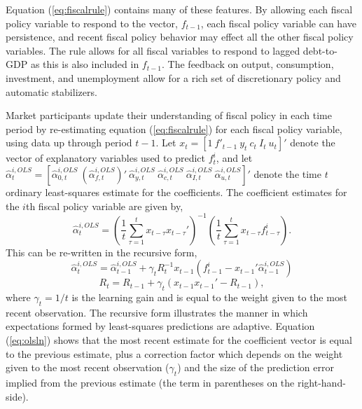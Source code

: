 \documentclass[11pt]{article}
\newcommand{\beq}{\begin{equation}}
\newcommand{\eeq}{\end{equation}}
\begin{document}
Equation (\ref{eq:fiscalrule}) contains many of these features.  By allowing each fiscal policy variable to respond to the vector, $f_{t-1}$, each fiscal policy variable can have persistence, and recent fiscal policy behavior may effect all the other fiscal policy variables.  The rule allows for all fiscal variables to respond to lagged debt-to-GDP as this is also included in $f_{t-1}$.  The feedback on output, consumption, investment, and unemployment allow for a rich set of discretionary policy and automatic stabilizers.

Market participants update their understanding of fiscal policy in each time period by re-estimating equation (\ref{eq:fiscalrule}) for each fiscal policy variable, using data up through period $t-1$.  Let $x_{t} = [1~ f'_{t-1}~ y_t~ c_t~ I_t~ u_t]'$ denote the vector of explanatory variables used to predict $f^i_{t}$, and let $\hat{\alpha}^{i,OLS}_{t} = [\hat{\alpha}^{i,OLS}_{0,t}~ (\hat{\alpha}^{i,OLS}_{f,t})'~ \hat{\alpha}^{i,OLS}_{y,t}~ \hat{\alpha}^{i,OLS}_{c,t}~ \hat{\alpha}^{i,OLS}_{I,t}~ \hat{\alpha}^{i,OLS}_{u,t}]'$ denote the time $t$ ordinary least-squares estimate for the coefficients.  The coefficient estimates for the $i$th fiscal policy variable are given by,
\beq \hat{\alpha}^{i,OLS}_{t} = \left( \frac{1}{t} \sum_{\tau=1}^{t} x_{t-\tau} x_{t-\tau}' \right)^{-1}  \left( \frac{1}{t} \sum_{\tau=1}^{t} x_{t-\tau}  f^i_{t-\tau} \right). \eeq
This can be re-written in the recursive form,
\beq \label{eq:olsln} \hat{\alpha}^{i,OLS}_t = \hat{\alpha}^{i,OLS}_{t-1} + \gamma_t  R_t^{-1} x_{t-1} \left(f^i_{t-1} - x_{t-1}'\hat{\alpha}^{i,OLS}_{t-1}\right) \eeq
\beq \label{eq:olslnR} R_t = R_{t-1} + \gamma_t \left(x_{t-1} x_{t-1}' - R_{t-1}\right), \eeq
where $\gamma_{t} = 1/t$ is the learning gain and is equal to the weight given to the most recent observation.  The recursive form illustrates the manner in which expectations formed by least-squares predictions are adaptive.  Equation (\ref{eq:olsln}) shows that the most recent estimate for the coefficient vector is equal to the previous estimate, plus a correction factor which depends on the weight given to the most recent observation ($\gamma_t$) and the size of the prediction error implied from the previous estimate (the term in parentheses on the right-hand-side).  
\end{document}

